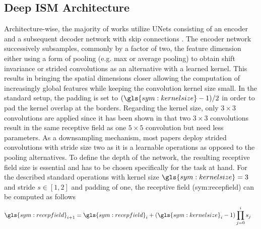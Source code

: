 \subsection{Deep ISM Architecture}
\label{subsec:architecture}
Architecture-wise, the majority of works utilize UNets \cite{ronneberger2015u} consisting of an encoder and a subsequent decoder network with skip connections \cite{prophet2019semantic,sless2019road,wirges2018evidential,weston2019probably,schulter2018learning,lu2019monocular,mani2020monolayout}. The encoder network successively subsamples, commonly by a factor of two, the feature dimension either using a form of pooling (e.g. max or average pooling) to obtain shift invariance or strided convolutions as an alternative with a learned kernel. This results in bringing the spatial dimensions closer allowing the computation of increasingly global features while keeping the convolution kernel size small. In the standard setup, the padding is set to $(\gls{sym:kernelsize}-1)/2$ in order to pad the kernel overlap at the borders. Regarding the kernel size, only $3 \times 3$ convolutions are applied since it has been shown in \cite{simonyan2014very} that two $3 \times 3$ convolutions result in the same receptive field as one $5 \times 5$ convolution but need less parameters. As a downsampling mechanism, most papers deploy strided convolutions with stride size two as it is a learnable operations as opposed to the pooling alternatives. To define the depth of the network, the resulting receptive field size is essential and has to be chosen specifically for the task at hand. For the described standard operations with kernel size $\gls{sym:kernelsize}=3$ and stride $s \in [1,2]$ and padding of one, the receptive field (\gls{sym:recepfield}) can be computed as follows
\begin{align}
	\label{eq:receptive_field}
	\gls{sym:recepfield}_{i+1} &= \gls{sym:recepfield}_i + (\gls{sym:kernelsize}_i-1)\prod_{j=0}^{i}s_j
\end{align}
